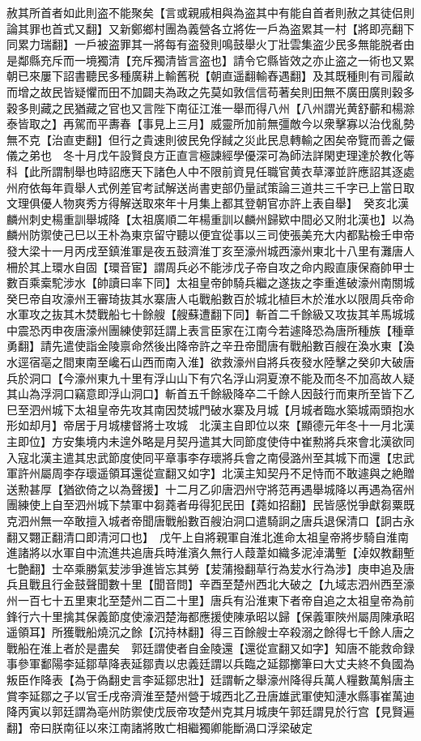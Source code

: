 赦其所首者如此則盗不能聚矣【言或親戚相與為盗其中有能自首者則赦之其徒侣則論其罪也首式又翻】又新鄭鄉村團為義營各立將佐一戶為盗累其一村【將即亮翻下同累力瑞翻】一戶被盗罪其一將每有盗發則鳴鼓舉火丁壯雲集盗少民多無能脱者由是鄰縣充斥而一境獨清【充斥獨清皆言盗也】請令它縣皆效之亦止盗之一術也又累朝已來屢下詔書聽民多種廣耕上輸舊税【朝直遥翻輸舂遇翻】及其既種則有司履畝而增之故民皆疑懼而田不加闢夫為政之先莫如敦信信苟著矣則田無不廣田廣則穀多穀多則藏之民猶藏之官也又言陛下南征江淮一舉而得八州【八州謂光黄舒蘄和楊滁泰皆取之】再駕而平夀春【事見上三月】威靈所加前無彊敵今以衆擊寡以治伐亂勢無不克【治直吏翻】但行之貴速則彼民免俘馘之災此民息轉輸之困矣帝覽而善之儼儀之弟也　冬十月戊午設賢良方正直言極諫經學優深可為師法詳閑吏理達於教化等科【此所謂制舉也時詔應天下諸色人中不限前資見任職官黄衣草澤並許應詔其逐處州府依每年貢舉人式例差官考試解送尚書吏部仍量試策論三道共三千字已上當日取文理俱優人物爽秀方得解送取來年十月集上都其登朝官亦許上表自舉】　癸亥北漢麟州刺史楊重訓舉城降【太祖廣順二年楊重訓以麟州歸欵中間必又附北漢也】以為麟州防禦使己巳以王朴為東京留守聽以便宜從事以三司使張美充大内都點檢壬申帝發大梁十一月丙戌至鎮淮軍是夜五鼓濟淮丁亥至濠州城西濠州東北十八里有灘唐人柵於其上環水自固【環音宦】謂周兵必不能涉戊子帝自攻之命内殿直康保裔帥甲士數百乘槖駝涉水【帥讀曰率下同】太祖皇帝帥騎兵繼之遂抜之李重進破濠州南關城癸巳帝自攻濠州王審琦抜其水寨唐人屯戰船數百於城北植巨木於淮水以限周兵帝命水軍攻之抜其木焚戰船七十餘艘【艘蘇遭翻下同】斬首二千餘級又攻抜其羊馬城城中震恐丙申夜唐濠州團練使郭廷謂上表言臣家在江南今若遽降恐為唐所種族【種章勇翻】請先遣使詣金陵禀命然後出降帝許之辛丑帝聞唐有戰船數百艘在渙水東【渙水逕宿亳之間東南至巉石山西而南入淮】欲救濠州自將兵夜發水陸擊之癸卯大破唐兵於洞口【今濠州東九十里有浮山山下有穴名浮山洞夏潦不能及而冬不加高故人疑其山為浮洞口竊意即浮山洞口】斬首五千餘級降卒二千餘人因鼓行而東所至皆下乙巳至泗州城下太祖皇帝先攻其南因焚城門破水寨及月城【月城者臨水築城兩頭抱水形如却月】帝居于月城樓督將士攻城　北漢主自即位以來【顯德元年冬十一月北漢主即位】方安集境内未遑外略是月契丹遣其大同節度使侍中崔勲將兵來會北漢欲同入寇北漢主遣其忠武節度使同平章事李存瓌將兵會之南侵潞州至其城下而還【忠武軍許州屬周李存瓌遥領耳還從宣翻又如字】北漢主知契丹不足恃而不敢遽與之絶贈送勲甚厚【猶欲倚之以為聲援】十二月乙卯唐泗州守將范再遇舉城降以再遇為宿州團練使上自至泗州城下禁軍中芻蕘者毋得犯民田【蕘如招翻】民皆感悦爭獻芻粟既克泗州無一卒敢擅入城者帝聞唐戰船數百艘泊洞口遣騎詗之唐兵退保清口【詗古永翻又翾正翻清口即清河口也】　戊午上自將親軍自淮北進命太祖皇帝將步騎自淮南進諸將以水軍自中流進共追唐兵時淮濱久無行人葭葦如織多泥淖溝塹【淖奴教翻塹七艶翻】士卒乘勝氣苃涉爭進皆忘其勞【苃蒲撥翻草行為苃水行為涉】庚申追及唐兵且戰且行金鼓聲聞數十里【聞音問】辛酉至楚州西北大破之【九域志泗州西至濠州一百七十五里東北至楚州二百二十里】唐兵有沿淮東下者帝自追之太祖皇帝為前鋒行六十里擒其保義節度使濠泗楚海都應援使陳承昭以歸【保義軍陜州屬周陳承昭遥領耳】所獲戰船燒沉之餘【沉持林翻】得三百餘艘士卒殺溺之餘得七千餘人唐之戰船在淮上者於是盡矣　郭廷謂使者自金陵還【還從宣翻又如字】知唐不能救命録事參軍鄱陽李延鄒草降表延鄒責以忠義廷謂以兵臨之延鄒擲筆曰大丈夫終不負國為叛臣作降表【為于偽翻史言李延鄒忠壯】廷謂斬之舉濠州降得兵萬人糧數萬斛唐主賞李延鄒之子以官壬戌帝濟淮至楚州營于城西北乙丑唐雄武軍使知漣水縣事崔萬迪降丙寅以郭廷謂為亳州防禦使戊辰帝攻楚州克其月城庚午郭廷謂見於行宫【見賢遍翻】帝曰朕南征以來江南諸將敗亡相繼獨卿能斷渦口浮梁破定